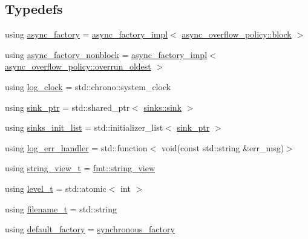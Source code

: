 \subsection*{Typedefs}
\begin{DoxyCompactItemize}
\item 
using \hyperlink{namespacespdlog_a962b94a80258f9a202d590888349577c}{async\+\_\+factory} = \hyperlink{structspdlog_1_1async__factory__impl}{async\+\_\+factory\+\_\+impl}$<$ \hyperlink{namespacespdlog_a42e109759a11c9514d3f6313a7709852a14511f2f5564650d129ca7cabc333278}{async\+\_\+overflow\+\_\+policy\+::block} $>$
\item 
using \hyperlink{namespacespdlog_a796f2e548cff4f12a5b2a52b07d3128b}{async\+\_\+factory\+\_\+nonblock} = \hyperlink{structspdlog_1_1async__factory__impl}{async\+\_\+factory\+\_\+impl}$<$ \hyperlink{namespacespdlog_a42e109759a11c9514d3f6313a7709852a6d09cc54ae10145444aa2f43fe46d9f2}{async\+\_\+overflow\+\_\+policy\+::overrun\+\_\+oldest} $>$
\item 
using \hyperlink{namespacespdlog_a173dd7064323e4807d720eabcc95fc73}{log\+\_\+clock} = std\+::chrono\+::system\+\_\+clock
\item 
using \hyperlink{namespacespdlog_a422c57d3088160b517e5a74e5f318253}{sink\+\_\+ptr} = std\+::shared\+\_\+ptr$<$ \hyperlink{classspdlog_1_1sinks_1_1sink}{sinks\+::sink} $>$
\item 
using \hyperlink{namespacespdlog_aa9b5c2298bf713fbe02b7e538d797ecd}{sinks\+\_\+init\+\_\+list} = std\+::initializer\+\_\+list$<$ \hyperlink{namespacespdlog_a422c57d3088160b517e5a74e5f318253}{sink\+\_\+ptr} $>$
\item 
using \hyperlink{namespacespdlog_ad3ed787a29f245c833ef66faf48036e2}{log\+\_\+err\+\_\+handler} = std\+::function$<$ void(const std\+::string \&err\+\_\+msg)$>$
\item 
using \hyperlink{namespacespdlog_af48e310b2f366ac6544701e6a3b56247}{string\+\_\+view\+\_\+t} = \hyperlink{core_8h_a17e3ff7f9ac2b8f068f719b829890036}{fmt\+::string\+\_\+view}
\item 
using \hyperlink{namespacespdlog_a8585bf495310a6ce695191739351709b}{level\+\_\+t} = std\+::atomic$<$ int $>$
\item 
using \hyperlink{namespacespdlog_acf7ce125b3622e44f8f1702d699e0b06}{filename\+\_\+t} = std\+::string
\item 
using \hyperlink{namespacespdlog_a349fb42bd8e759a32021b46fcdaca6c6}{default\+\_\+factory} = \hyperlink{structspdlog_1_1synchronous__factory}{synchronous\+\_\+factory}
\end{DoxyCompactItemize}
